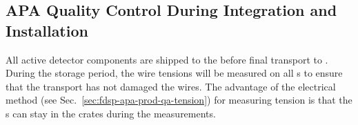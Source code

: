 \subsection{APA Quality Control During Integration and Installation} %
\label{sec:fdsp-apa-transport-qc}

All active detector components are shipped to the  before final transport to . During the storage period, the wire tensions will be measured on all s to ensure that the transport has not damaged the wires. The advantage of the electrical method (see Sec.~\ref{sec:fdsp-apa-prod-qa-tension}) for measuring tension is that the s can stay in the crates during the measurements. 


